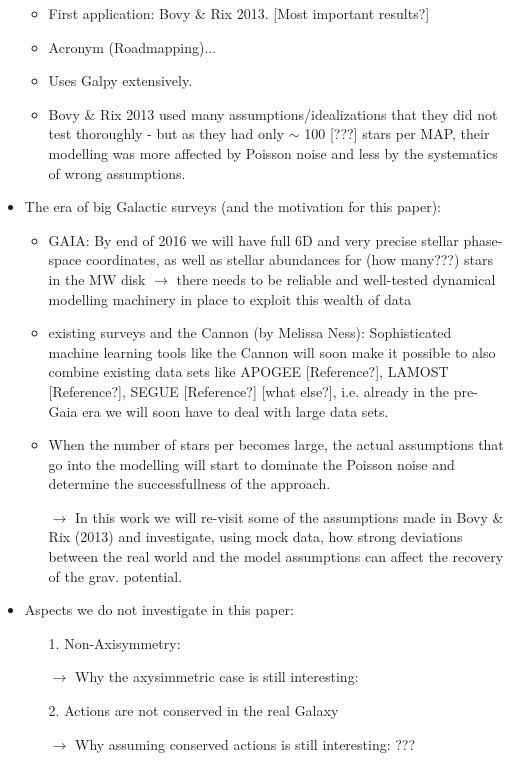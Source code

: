 \begin{itemize}
\begin{itemize}
\begin{itemize}
\end{itemize}
\item First application: Bovy \& Rix 2013. [Most important results?]
\item Acronym (Roadmapping)...
\item Uses Galpy extensively.
\item Bovy \& Rix 2013 used many assumptions/idealizations that they did not test thoroughly - but as they had only $\sim$ 100 [???] stars per MAP, their modelling was more affected by Poisson noise and less by the systematics of wrong assumptions.
\end{itemize}

\item The era of big Galactic surveys (and the motivation for this paper):
\begin{itemize}
\item GAIA: By end of 2016 we will have full 6D and very precise stellar phase-space coordinates, as well as stellar abundances for (how many???) stars in the MW disk $\rightarrow$ there needs to be reliable and well-tested dynamical modelling machinery in place to exploit this wealth of data
\item existing surveys and the Cannon (by Melissa Ness): Sophisticated machine learning tools like the Cannon will soon make it possible to also combine existing data sets like APOGEE [Reference?], LAMOST [Reference?], SEGUE [Reference?] [what else?], i.e. already in the pre-Gaia era we will soon have to deal with large data sets.
\item When the number of stars per \MAP becomes large, the actual assumptions that go into the modelling will start to dominate the Poisson noise and determine the successfullness of the approach.
\item[$\rightarrow$] In this work we will re-visit some of the assumptions made in Bovy \& Rix (2013) and investigate, using mock data, how strong deviations between the real world and the model assumptions can affect the recovery of the grav. potential.
\end{itemize}



\item Aspects we do not investigate in this paper:
\begin{itemize}
\item[1.] Non-Axisymmetry: 
\item[$\rightarrow$] Why the axysimmetric case is still interesting:
\item[2.] Actions are not conserved in the real Galaxy
\item[$\rightarrow$] Why assuming conserved actions is still interesting: ???
\end{itemize}

\end{itemize}
